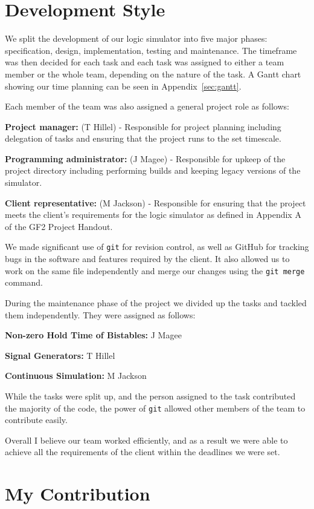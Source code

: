 \documentclass[a4paper,10pt]{article}
\begin{document}
\section{Development Style}

We split the development of our logic simulator into five major phases: specification, design, implementation, testing and maintenance. The timeframe was then decided for each task and each task was assigned to either a team member or the whole team, depending on the nature of the task. A Gantt chart showing our time planning can be seen in Appendix~\ref{sec:gantt}.

Each member of the team was also assigned a general project role as follows:

\textbf{Project manager:} (T Hillel) - Responsible for project planning including delegation of tasks and ensuring that the project runs to the set timescale.

\textbf{Programming administrator:} (J Magee) - Responsible for upkeep of the project directory including performing builds and keeping legacy versions of the simulator.

\textbf{Client representative:} (M Jackson) - Responsible for ensuring that the project meets the client's requirements for the logic simulator as defined in Appendix A of the GF2 Project Handout.

We made significant use of \texttt{git} for revision control, as well as GitHub for tracking bugs in the software and features required by the client. It also allowed us to work on the same file independently and merge our changes using the \texttt{git merge} command.

During the maintenance phase of the project we divided up the tasks and tackled them independently. They were assigned as follows:

\textbf{Non-zero Hold Time of Bistables:} J Magee

\textbf{Signal Generators:} T Hillel

\textbf{Continuous Simulation:} M Jackson

While the tasks were split up, and the person assigned to the task contributed the majority of the code, the power of \texttt{git} allowed other members of the team to contribute easily.

Overall I believe our team worked efficiently, and as a result we were able to achieve all the requirements of the client within the deadlines we were set.

\section{My Contribution}
\end{document}
